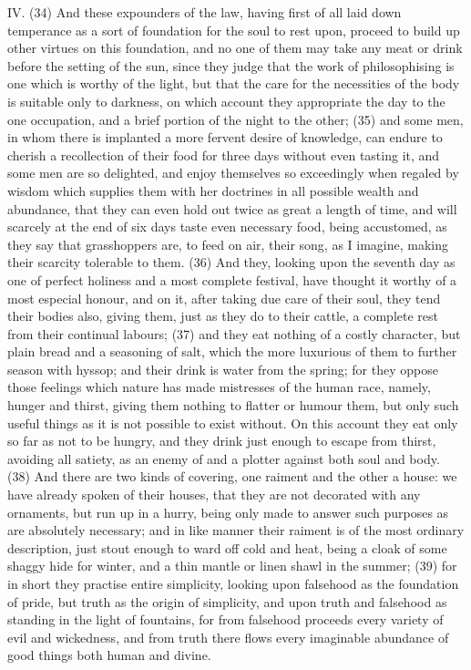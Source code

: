 IV. (34) And these expounders of the law, having first of all laid down temperance as a sort of
foundation for the soul to rest upon, proceed to build up other virtues on this foundation, and no
one of them may take any meat or drink before the setting of the sun, since they judge that the
work of philosophising is one which is worthy of the light, but that the care for the necessities of the
body is suitable only to darkness, on which account they appropriate the day to the one
occupation, and a brief portion of the night to the other; (35) and some men, in whom there is
implanted a more fervent desire of knowledge, can endure to cherish a recollection of their food
for three days without even tasting it, and some men are so delighted, and enjoy themselves so
exceedingly when regaled by wisdom which supplies them with her doctrines in all possible wealth
and abundance, that they can even hold out twice as great a length of time, and will scarcely at the
end of six days taste even necessary food, being accustomed, as they say that grasshoppers are,
to feed on air, their song, as I imagine, making their scarcity tolerable to them. (36) And they,
looking upon the seventh day as one of perfect holiness and a most complete festival, have
thought it worthy of a most especial honour, and on it, after taking due care of their soul, they tend
their bodies also, giving them, just as they do to their cattle, a complete rest from their continual
labours; (37) and they eat nothing of a costly character, but plain bread and a seasoning of salt,
which the more luxurious of them to further season with hyssop; and their drink is water from the
spring; for they oppose those feelings which nature has made mistresses of the human race,
namely, hunger and thirst, giving them nothing to flatter or humour them, but only such useful things
as it is not possible to exist without. On this account they eat only so far as not to be hungry, and
they drink just enough to escape from thirst, avoiding all satiety, as an enemy of and a plotter
against both soul and body. (38) And there are two kinds of covering, one raiment and the other a
house: we have already spoken of their houses, that they are not decorated with any ornaments,
but run up in a hurry, being only made to answer such purposes as are absolutely necessary; and
in like manner their raiment is of the most ordinary description, just stout enough to ward off cold
and heat, being a cloak of some shaggy hide for winter, and a thin mantle or linen shawl in the
summer; (39) for in short they practise entire simplicity, looking upon falsehood as the foundation
of pride, but truth as the origin of simplicity, and upon truth and falsehood as standing in the light of
fountains, for from falsehood proceeds every variety of evil and wickedness, and from truth there
flows every imaginable abundance of good things both human and divine.

